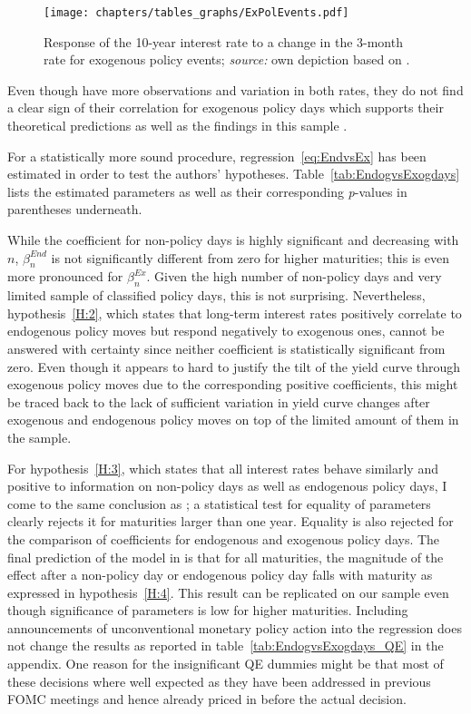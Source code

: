 \begin{figure}[htbp]
	\centering
	\texttt{[image: chapters/tables\_graphs/ExPolEvents.pdf]} 
	\caption[Response of the 10-year interest rate to a change in the 3-month rate for exogenous policy events]{Response of the 10-year interest rate to a change in the 3-month rate for exogenous policy events; \textit{source:} own depiction based on \textcite{Ellingsen.2003}.}
	\label{fig:ExPolEvents}
\end{figure}
%
Even though \textcite{Ellingsen.2003} have more observations and variation in both rates, they do not find a clear sign of their correlation for exogenous policy days which supports their theoretical predictions as well as the findings in this sample . 

For a statistically more sound procedure, regression~\eqref{eq:EndvsEx} has been estimated in order to test the authors' hypotheses. Table~\vref{tab:EndogvsExogdays} lists the estimated parameters as well as their corresponding \textit{p}-values in parentheses underneath.

%
While the coefficient for non-policy days is highly significant and decreasing with $n$, $\beta_n^{End}$ is not significantly different from zero for higher maturities; this is even more pronounced for $\beta_n^{Ex}$. Given the high number of non-policy days and very limited sample of classified policy days, this is not surprising. Nevertheless, hypothesis~\ref{H:2}, which states that long-term interest rates positively correlate to endogenous policy moves but respond negatively to exogenous ones, cannot be answered with certainty since neither coefficient is statistically significant from zero. Even though it appears to hard to justify the tilt of the yield curve through exogenous policy moves due to the corresponding positive coefficients, this might be traced back to the lack of sufficient variation in yield curve changes after exogenous and endogenous policy moves on top of the limited amount of them in the sample. 

For hypothesis~\ref{H:3}, which states that all interest rates behave similarly and positive to information on non-policy days as well as endogenous policy days, I come to the same conclusion as \textcite{Ellingsen.2003}; a statistical test for equality of parameters clearly rejects it for maturities larger than one year. Equality is also rejected for the comparison of coefficients for endogenous and exogenous policy days. The final prediction of the model in \textcite{Ellingsen.2001} is that for all maturities, the magnitude of the effect after a non-policy day or endogenous policy day falls with maturity as expressed in hypothesis~\ref{H:4}. This result can be replicated on our sample even though significance of parameters is low for higher maturities. 
Including announcements of unconventional monetary policy action into the regression does not change the results as reported in table~\vref{tab:EndogvsExogdays_QE} in the appendix. One reason for the insignificant QE dummies might be that most of these decisions where well expected as they have been addressed in previous FOMC meetings and hence already priced in before the actual decision. 

